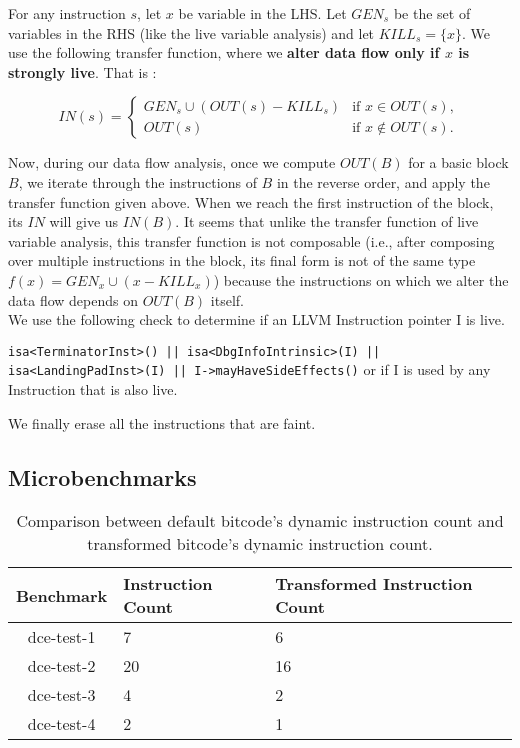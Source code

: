 For any instruction $s$, let $x$ be variable in the LHS. Let $GEN_s$ be the set of variables in the RHS (like the live variable analysis) and
let $KILL_s = \{x\}$. We use the following transfer function, where we \textbf{alter data flow only if $x$ is strongly live}. That is :

\[
IN(s) = \left\{ 
\begin{array}{ll}
GEN_s \cup (OUT(s)-KILL_s) & \mbox{if } x \in OUT(s),\\
OUT(s) & \mbox{if } x \notin OUT(s).
\end{array}
\right.
\]

Now, during our data flow analysis, once we compute $OUT(B)$ for a basic block $B$, we iterate through the instructions of $B$ in the reverse order, and apply the transfer function given above. When we reach the first instruction of the block, its $IN$ will give us $IN(B)$. It seems that unlike the transfer function of live variable analysis, this transfer function is not composable (i.e., after composing over multiple instructions in the block, its final form is not of the same type $f(x) = GEN_x \cup (x-KILL_x)$) because the instructions on which we alter the data flow depends on $OUT(B)$ itself.\\  

We use the following check to determine if an LLVM Instruction pointer I is live.

\texttt{isa<TerminatorInst>() || isa<DbgInfoIntrinsic>(I) || \\  isa<LandingPadInst>(I) || I->mayHaveSideEffects()} or if I is used by any Instruction that is also live. 

We finally erase all the instructions that are faint.

\subsection{Microbenchmarks}

\begin{table}[!ht]
\centering
\begin{tabular}{c|l|l}
  \toprule
  \textbf{Benchmark} & \textbf{Instruction Count} & \textbf{Transformed Instruction Count} \\
  \midrule
  dce-test-1 & 7  & 6  \\ 
  dce-test-2 & 20 & 16 \\
  dce-test-3 & 4  & 2  \\
  dce-test-4 & 2  & 1  \\
  \bottomrule
\end{tabular}
\caption{Comparison between default bitcode's dynamic instruction count and transformed
  bitcode's dynamic instruction count.}
\end{table}  

\newpage

